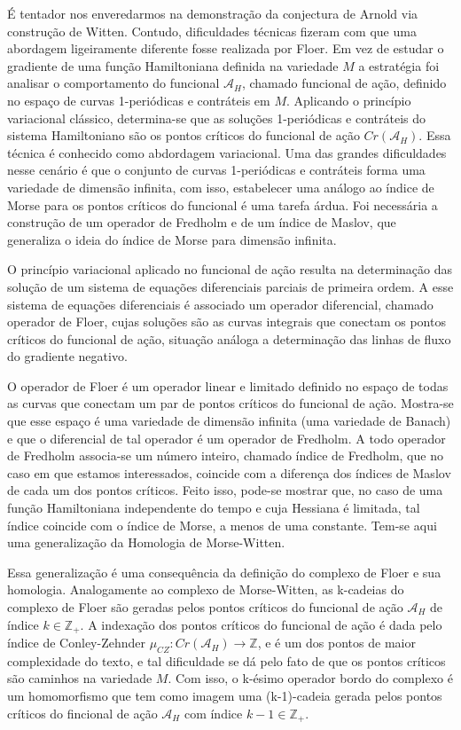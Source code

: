 \documentclass[12pt]{book}
\newcommand{\funcionalH}{\mathcal{A}_{H}}
\newcommand{\iconleyabrev}{\mu_{CZ}}
\newcommand{\inteiros}{\mathbb{Z}}
\newcommand{\pontoscriticos}[1]{\textit{Cr}(#1)}
\begin{document}
	É tentador nos enveredarmos na demonstração da conjectura de Arnold via construção de Witten. Contudo, dificuldades técnicas fizeram com que uma abordagem ligeiramente diferente fosse realizada por Floer. Em vez de estudar o gradiente de uma função Hamiltoniana definida na variedade $M$ a estratégia foi analisar o comportamento do funcional $\funcionalH$, chamado funcional de ação, definido no espaço de curvas 1-periódicas e contráteis em $M$. Aplicando o princípio variacional clássico, determina-se que as soluções 1-periódicas e contráteis do sistema Hamiltoniano são os pontos críticos do funcional de ação $\pontoscriticos{\funcionalH}$. Essa técnica é conhecido como abdordagem variacional. Uma das grandes dificuldades nesse cenário é que o conjunto de curvas 1-periódicas e contráteis forma uma variedade de dimensão infinita, com isso, estabelecer uma análogo ao índice de Morse para os pontos críticos do funcional é uma tarefa árdua. Foi necessária a construção de um operador de Fredholm e de um índice de Maslov, que generaliza o ideia do índice de Morse para dimensão infinita.
	
	O princípio variacional aplicado no funcional de ação resulta na determinação das solução de um sistema de equações diferenciais parciais de primeira ordem. A esse sistema de equações diferenciais é associado um operador diferencial, chamado operador de Floer, cujas soluções são as curvas integrais que conectam os pontos críticos do funcional de ação, situação análoga a determinação das linhas de fluxo do gradiente negativo.
	
	O operador de Floer é um operador linear e limitado definido no espaço de todas as curvas que conectam um par de pontos críticos do funcional de ação. Mostra-se que esse espaço é uma variedade de dimensão infinita (uma variedade de Banach) e que o diferencial de tal operador é um operador de Fredholm. A todo operador de Fredholm associa-se um número inteiro, chamado índice de Fredholm, que no caso em que estamos interessados, coincide com a diferença dos índices de Maslov de cada um dos pontos críticos. Feito isso, pode-se mostrar que, no caso de uma função Hamiltoniana independente do tempo e cuja Hessiana é limitada, tal índice coincide com o índice de Morse, a menos de uma constante. Tem-se aqui uma generalização da Homologia de Morse-Witten.
	
	Essa generalização é uma consequência da definição do complexo de Floer e sua homologia. Analogamente ao complexo de Morse-Witten, as k-cadeias do complexo de Floer são geradas pelos pontos críticos do funcional de ação $\funcionalH$ de índice $k \in \inteiros_{+}$. A indexação dos pontos críticos do funcional de ação é dada pelo índice de Conley-Zehnder $\iconleyabrev:\pontoscriticos{\funcionalH} \to \inteiros$, e é um dos pontos de maior complexidade do texto, e tal dificuldade se dá pelo fato de que os pontos críticos são caminhos na variedade $M$. Com isso, o k-ésimo operador bordo do complexo é um homomorfismo que tem como imagem uma (k-1)-cadeia gerada pelos pontos críticos do fincional de ação $\funcionalH$ com índice $k-1 \in \inteiros_{+}$.
	
\end{document}
